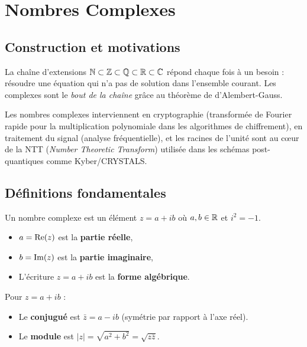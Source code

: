 \chapter{Nombres Complexes}

\section{Construction et motivations}

La chaîne d'extensions $\mathbb{N} \subset \mathbb{Z} \subset \mathbb{Q} \subset \mathbb{R} \subset \mathbb{C}$ répond chaque fois à un besoin : résoudre une équation qui n'a pas de solution dans l'ensemble courant. Les complexes sont le \emph{bout de la chaîne} grâce au théorème de d'Alembert-Gauss.

\begin{intuitionbox}
Les nombres complexes interviennent en cryptographie (transformée de Fourier rapide pour la multiplication polynomiale dans les algorithmes de chiffrement), en traitement du signal (analyse fréquentielle), et les racines de l'unité sont au c\oe ur de la NTT (\textit{Number Theoretic Transform}) utilisée dans les schémas post-quantiques comme Kyber/CRYSTALS.
\end{intuitionbox}

\section{Définitions fondamentales}

\begin{defbox}
Un nombre complexe est un élément $z = a + ib$ où $a, b \in \mathbb{R}$ et $i^2 = -1$.
\begin{itemize}[leftmargin=1cm]
  \item $a = \operatorname{Re}(z)$ est la \textbf{partie réelle},
  \item $b = \operatorname{Im}(z)$ est la \textbf{partie imaginaire},
  \item L'écriture $z = a + ib$ est la \textbf{forme algébrique}.
\end{itemize}
\end{defbox}

\begin{defbox}
Pour $z = a + ib$ :
\begin{itemize}[leftmargin=1cm]
  \item Le \textbf{conjugué} est $\bar{z} = a - ib$ (symétrie par rapport à l'axe réel).
  \item Le \textbf{module} est $|z| = \sqrt{a^2 + b^2} = \sqrt{z\bar{z}}$.
\end{itemize}
\end{defbox}

